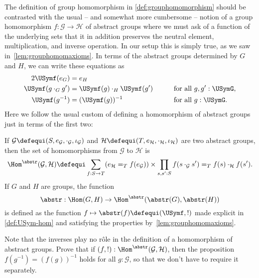 The definition of group homomorphism in \cref{def:grouphomomorphism} should be contrasted with the usual -- and somewhat more cumbersome -- notion of a group homomorphism $f\colon \mathcal G\to \mathcal H$ of abstract groups where we must ask of a function of the underlying sets that it in addition preserves the neutral element,
multiplication, and inverse operation.
In our setup this is simply true, as we saw in~\cref{lem:grouphomomaxioms}.
In terms of the abstract groups determined by $G$ and $H$, we can write these equations
as
\begin{alignat*}2
  \USymf ( e_G )
  &= e_H
  &\qquad& \\
  \USymf (g \cdot_G g') &= \USymf(g) \cdot_H \USymf(g')
  && \text{for all $g, g' : \USymG$,} \\
  \USymf (g ^ {-1})
  &= (\USymf (g))^{-1}
  && \text{for all $g : \USymG$.}
\end{alignat*}
Here we follow the usual custom of defining a homomorphism of abstract groups
just in terms of the first two:
\begin{definition}\label{def:abstrisfunctor}
  If $\mathcal G\defequi(S,e_{\mathcal G},\cdot_{\mathcal G},\iota_{\mathcal G})$ and $\mathcal H\defequi(T,e_{\mathcal H},\cdot_{\mathcal H},\iota_{\mathcal H})$ are two abstract groups, then the set of homomorphisms from $\mathcal G$ to $\mathcal H$ is
  \[
    \Hom^\abstr(\mathcal G,\mathcal H)
    \defequi\sum_{f:S\to T}(e_{\mathcal H}=_Tf(e_{\mathcal G}))\times
    \prod_{s,s':S}f(s\cdot_{\mathcal G}s')=_Tf(s)\cdot_{\mathcal H}f(s').
  \]
  If $G$ and $H$ are groups, the function
  \[
    \abstr:\Hom(G,H)\to\Hom^\abstr(\abstr(G),\abstr(H))
  \]
  is defined as the function $f\mapsto \abstr(f)\defequi(\USymf,!)$
  made explicit in \cref{def:USym-hom} and satisfying the
  properties by~\cref{lem:grouphomomaxioms}.
\end{definition}
\begin{xca}
  Note that the inverses play no r\^ole in the definition of a homomorphism of abstract groups.  Prove that if $(f,!):\Hom^\abstr(\mathcal G,\mathcal H)$,
  then the proposition $f(g^{-1})=(f(g))^{-1}$ holds for all $g:\mathcal G$,
  so that we don't have to require it separately.
\end{xca}
